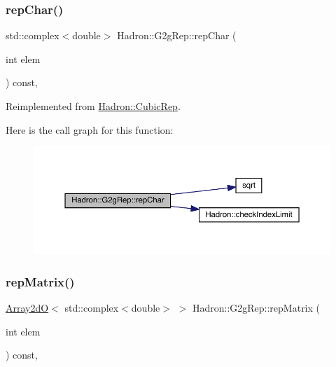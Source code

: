 \subsubsection{\texorpdfstring{repChar()}{repChar()}\hspace{0.1cm}{\footnotesize\ttfamily [2/2]}}
{\footnotesize\ttfamily std\+::complex$<$double$>$ Hadron\+::\+G2g\+Rep\+::rep\+Char (\begin{DoxyParamCaption}\item[{int}]{elem }\end{DoxyParamCaption}) const\hspace{0.3cm}{\ttfamily [inline]}, {\ttfamily [virtual]}}



Reimplemented from \mbox{\hyperlink{structHadron_1_1CubicRep_af45227106e8e715e84b0af69cd3b36f8}{Hadron\+::\+Cubic\+Rep}}.

Here is the call graph for this function\+:
\nopagebreak
\begin{figure}[H]
\begin{center}
\leavevmode
\includegraphics[width=350pt]{d9/d3e/structHadron_1_1G2gRep_ab31419c7383dac18c56c70f3ca7220a9_cgraph}
\end{center}
\end{figure}
\mbox{\label{structHadron_1_1G2gRep_af178c31ae966d7c1025673a0889b7f6f}} 
\subsubsection{\texorpdfstring{repMatrix()}{repMatrix()}\hspace{0.1cm}{\footnotesize\ttfamily [1/2]}}
{\footnotesize\ttfamily \mbox{\hyperlink{classADAT_1_1Array2dO}{Array2dO}}$<$ std\+::complex$<$double$>$ $>$ Hadron\+::\+G2g\+Rep\+::rep\+Matrix (\begin{DoxyParamCaption}\item[{int}]{elem }\end{DoxyParamCaption}) const\hspace{0.3cm}{\ttfamily [inline]}, {\ttfamily [virtual]}}



